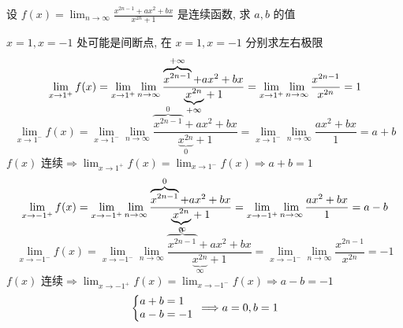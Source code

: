 \documentclass[color=green,titlestyle=hang]{elegantbook}%
\begin{document}
\begin{example}
设 $f(x)=\lim_{n\to\infty}\frac{x^{2n-1}+ax^2+bx}{x^{2n}+1}$ 是连续函数, 求 $a,b$ 的值
\end{example}\begin{solution} $x=1,x=-1$ 处可能是间断点, 在 $x=1,x=-1$ 分别求左右极限
\[\lim_{x\to1^+}f(x)=\lim_{x\to1^+}\lim_{n\to\infty}\frac{\overbrace{x^{2n-1}}^{+\infty}+ax^2+bx}{\smash{\underbrace{x^{2n}}_{+\infty}}+1}=
\lim_{x\to1^+}\lim_{n\to\infty}\frac{x^{2n-1}}{x^{2n}}=1\]
\[\lim_{x\to1^-}f(x)=\lim_{x\to1^-}\lim_{n\to\infty}\frac{\overbrace{x^{2n-1}}^{0}+ax^2+bx}{\underbrace{x^{2n}}_0+1}=
\lim_{x\to1^-}\lim_{n\to\infty}\frac{ax^2+bx}{1}=a+b\]
$f(x)$ 连续$\Longrightarrow \lim_{x\to1^+}f(x)=\lim_{x\to1^-}f(x)\Longrightarrow a+b=1$
\[\lim_{x\to-1^+}f(x)=\lim_{x\to-1^+}\lim_{n\to\infty}\frac{\overbrace{x^{2n-1}}^0+ax^2+bx}{\smash{\underbrace{x^{2n}}_0}+1}=
\lim_{x\to-1^+}\lim_{n\to\infty}\frac{ax^2+bx}{1}=a-b\]
\[\lim_{x\to-1^-}f(x)=\lim_{x\to-1^-}\lim_{n\to\infty}\frac{\overbrace{x^{2n-1}}^{\infty}+ax^2+bx}{\underbrace{x^{2n}}_{\infty}+1}=
\lim_{x\to-1^-}\lim_{n\to\infty}\frac{x^{2n-1}}{x^{2n}}=-1\]
$f(x)$ 连续$\Longrightarrow \lim_{x\to-1^+}f(x)=\lim_{x\to-1^-}f(x)\Longrightarrow a-b=-1$
\[\bigg\{\begin{array}{@{}l}
a+b=1\\a-b=-1
\end{array}\Longrightarrow a=0,b=1\]
\end{solution}
\end{document}
